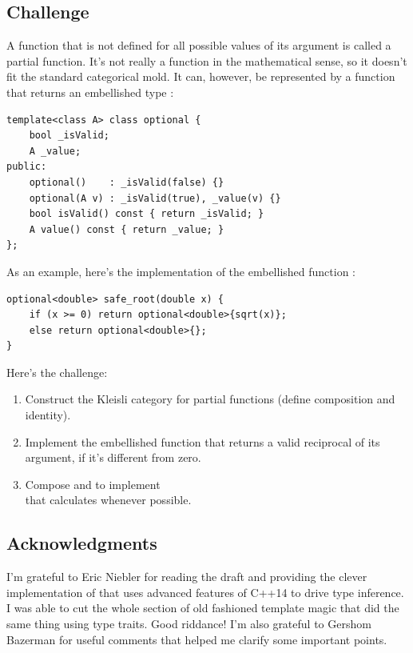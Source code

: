 \subsection{Challenge}\label{challenge}

A function that is not defined for all possible values of its argument
is called a partial function. It's not really a function in the
mathematical sense, so it doesn't fit the standard categorical mold. It
can, however, be represented by a function that returns an embellished
type :

\begin{verbatim}
template<class A> class optional {
    bool _isValid;
    A _value;
public: 
    optional()    : _isValid(false) {}
    optional(A v) : _isValid(true), _value(v) {}
    bool isValid() const { return _isValid; }
    A value() const { return _value; }
};
\end{verbatim}

As an example, here's the implementation of the embellished function
:

\begin{verbatim}
optional<double> safe_root(double x) {
    if (x >= 0) return optional<double>{sqrt(x)}; 
    else return optional<double>{};
}
\end{verbatim}

Here's the challenge:

\begin{enumerate}
\tightlist
\item
  Construct the Kleisli category for partial functions (define
  composition and identity).
\item
  Implement the embellished function  that
  returns a valid reciprocal of its argument, if it's different from
  zero.
\item
  Compose  and  to implement\\
   that calculates 
  whenever possible.
\end{enumerate}

\subsection{Acknowledgments}\label{acknowledgments}

I'm grateful to Eric Niebler for reading the draft and providing the
clever implementation of  that uses advanced features of
C++14 to drive type inference. I was able to cut the whole section of
old fashioned template magic that did the same thing using type traits.
Good riddance! I'm also grateful to Gershom Bazerman for useful comments
that helped me clarify some important points.